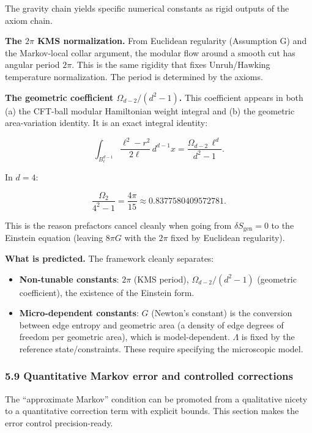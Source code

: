 \documentclass[
]{article}
\providecommand{\tightlist}{%
  \setlength{\itemsep}{0pt}\setlength{\parskip}{0pt}}
\begin{document}
The gravity chain yields specific numerical constants as rigid outputs
of the axiom chain.

\textbf{The \(2\pi\) KMS normalization.} From Euclidean regularity
(Assumption G) and the Markov-local collar argument, the modular flow
around a smooth cut has angular period \(2\pi\). This is the same
rigidity that fixes Unruh/Hawking temperature normalization. The period
is determined by the axioms.

\textbf{The geometric coefficient \(\Omega_{d-2}/(d^2 - 1)\).} This
coefficient appears in both (a) the CFT-ball modular Hamiltonian weight
integral and (b) the geometric area-variation identity. It is an exact
integral identity:

\[
\int_{B^{d-1}_\ell} \frac{\ell^2 - r^2}{2\ell} \, d^{d-1}x
= \frac{\Omega_{d-2} \, \ell^d}{d^2 - 1}.
\]

In \(d = 4\):

\[
\frac{\Omega_2}{4^2 - 1} = \frac{4\pi}{15} \approx 0.8377580409572781.
\]

This is the reason prefactors cancel cleanly when going from
\(\delta S_{\mathrm{gen}} = 0\) to the Einstein equation (leaving
\(8\pi G\) with the \(2\pi\) fixed by Euclidean regularity).

\textbf{What is predicted.} The framework cleanly separates:

\begin{itemize}
\tightlist
\item
  \textbf{Non-tunable constants}: \(2\pi\) (KMS period),
  \(\Omega_{d-2}/(d^2-1)\) (geometric coefficient), the existence of the
  Einstein form.
\item
  \textbf{Micro-dependent constants}: \(G\) (Newton's constant) is the
  conversion between edge entropy and geometric area (a density of edge
  degrees of freedom per geometric area), which is model-dependent.
  \(\Lambda\) is fixed by the reference state/constraints. These require
  specifying the microscopic model.
\end{itemize}

\subsubsection{5.9 Quantitative Markov error and controlled
corrections}\label{quantitative-markov-error-and-controlled-corrections}

The ``approximate Markov'' condition can be promoted from a qualitative
nicety to a quantitative correction term with explicit bounds. This
section makes the error control precision-ready.
\end{document}
